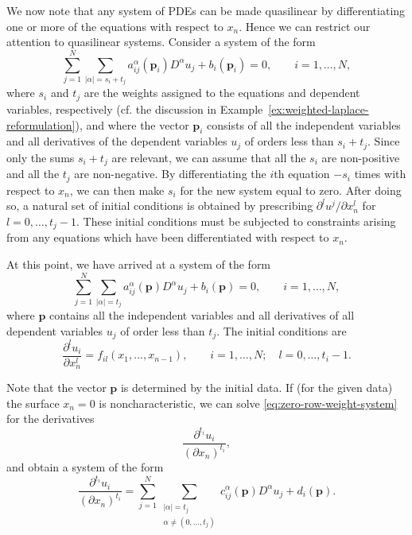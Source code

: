 We now note that any system of PDEs can be made quasilinear by differentiating one or more of the equations with respect to $x_n$. Hence we can restrict our attention to quasilinear systems. Consider a system of the form
\begin{equation}\label{eq:general-weighted-quasilinear-system}
\sum_{j=1}^N\sum_{|\alpha|=s_i+t_j}a_{ij}^{\alpha}(\bm{p}_i)D^\alpha u_j+b_i(\bm{p}_i)=0,\qquad i=1,\ldots,N,
\end{equation}
where $s_i$ and $t_j$ are the weights assigned to the equations and dependent variables, respectively (cf. the discussion in Example~\ref{ex:weighted-laplace-reformulation}), and where the vector $\bm{p}_i$ consists of all the independent variables and all derivatives of the dependent variables $u_j$ of orders less than $s_i+t_j$. Since only the sums $s_i+t_j$ are relevant, we can assume that all the $s_i$ are non-positive and all the $t_j$ are non-negative. By differentiating the $i$th equation $-s_i$ times with respect to $x_n$, we can then make $s_i$ for the new system equal to zero. After doing so, a natural set of initial conditions is obtained by prescribing $\partial^l u^j/\partial x_n^l$ for $l=0,\ldots,t_j-1$. These initial conditions must be subjected to constraints arising from any equations which have been differentiated with respect to $x_n$.

At this point, we have arrived at a system of the form
\begin{equation}\label{eq:zero-row-weight-system}
\sum_{j=1}^N\sum_{|\alpha|=t_j}a_{ij}^{\alpha}(\bm{p})D^\alpha u_j+b_i(\bm{p})=0,\qquad i=1,\ldots,N,
\end{equation}
where $\bm{p}$ contains all the independent variables and all derivatives of all dependent variables $u_j$ of order less than $t_j$. The initial conditions are
\begin{equation}\label{eq:weighted-system-initial-derivatives}
\dfrac{\partial^l u_i}{\partial x_n^l}=f_{il}(x_1,\ldots,x_{n-1}),\qquad i=1,\ldots,N;\quad l=0,\ldots,t_i-1.
\end{equation}


Note that the vector $\bm{p}$ is determined by the initial data. If (for the given data) the surface $x_n=0$ is noncharacteristic, we can solve \eqref{eq:zero-row-weight-system} for the derivatives
\begin{equation}\label{eq:highest-normal-derivatives}
\dfrac{\partial^{t_i}u_i}{(\partial x_n)^{t_i}},
\end{equation}
and obtain a system of the form
\begin{equation}\label{eq:normal-solved-weighted-system}
\dfrac{\partial^{t_i}u_i}{(\partial x_n)^{t_i}}=\sum_{j=1}^N\sum_{\substack{|\alpha|=t_j\\\alpha\ne(0,\ldots,t_j)}}c_{ij}^{\alpha}(\bm{p})D^\alpha u_j+d_i(\bm{p}).
\end{equation}


